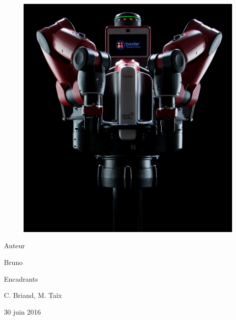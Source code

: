 \documentclass[a4paper,french, titlepage]{book}
\begin{document}
\begin{center}
\begin{figure}[H] 
\begin{center}
\includegraphics[scale=0.2]{Images/baxter.png}
\end{center}
\end{figure}

\vspace{0.5cm}

{\LARGE Auteur}\\

\vspace{0.2cm}

Bruno \\

\vspace{0.5cm}

{\Large Encadrants}\\

\vspace{0.2cm}

C. Briand, M. Taïx\\ 



\vspace{1cm}


30 juin 2016




\end{center}
\end{document}
